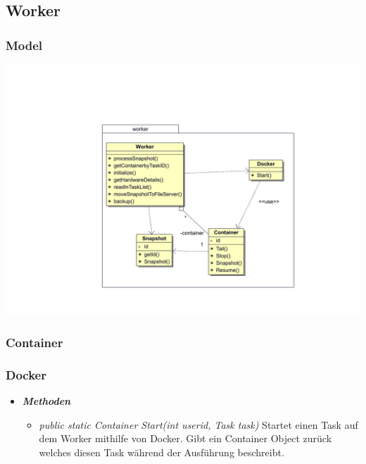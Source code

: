 \documentclass[a4paper,12pt]{article}
\begin{document}
\clearpage


\subsection{Worker}

\subsubsection{Model}

\includegraphics[width=\textwidth]{worker}

\subsubsection{Container}

\subsubsection{Docker}

\begin{itemize}[label={}]

	\item\textit{\textbf{Methoden}}
		\begin{itemize}[label={\textbullet}]
			\item\textit{public static Container Start(int userid, Task task)} Startet einen Task auf dem Worker mithilfe von Docker. Gibt ein Container Object zurück welches diesen Task während der Ausführung beschreibt.
			
		\end{itemize}
\end{itemize}
\end{document}

